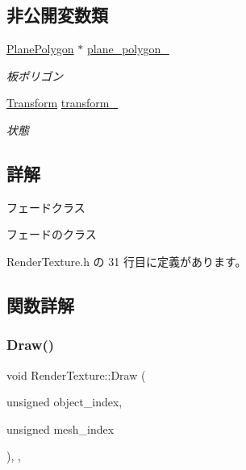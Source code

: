 \subsection*{非公開変数類}
\begin{DoxyCompactItemize}
\item 
\mbox{\hyperlink{class_plane_polygon}{Plane\+Polygon}} $\ast$ \mbox{\hyperlink{class_render_texture_ad354ed8b9968b5741feb43775cc821b9}{plane\+\_\+polygon\+\_\+}}
\begin{DoxyCompactList}\small\item\em 板ポリゴン \end{DoxyCompactList}\item 
\mbox{\hyperlink{class_transform}{Transform}} \mbox{\hyperlink{class_render_texture_a390e49a5efe8a6a977e8ba287ec969a2}{transform\+\_\+}}
\begin{DoxyCompactList}\small\item\em 状態 \end{DoxyCompactList}\end{DoxyCompactItemize}


\subsection{詳解}
フェードクラス 

フェードのクラス 

 Render\+Texture.\+h の 31 行目に定義があります。



\subsection{関数詳解}
\mbox{\label{class_render_texture_a529ab829c676470ae5764b42cba9efb0}} 
\subsubsection{\texorpdfstring{Draw()}{Draw()}}
{\footnotesize\ttfamily void Render\+Texture\+::\+Draw (\begin{DoxyParamCaption}\item[{unsigned}]{object\+\_\+index,  }\item[{unsigned}]{mesh\+\_\+index }\end{DoxyParamCaption})\hspace{0.3cm}{\ttfamily [inline]}, {\ttfamily [override]}, {\ttfamily [virtual]}}



